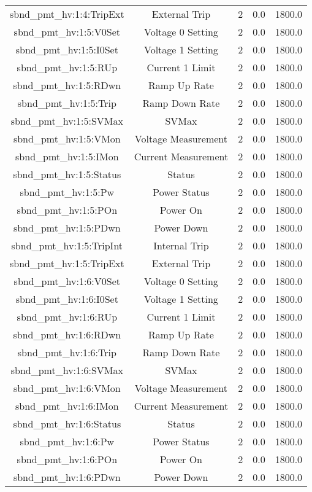 \begin{table}[ptb]
\begin{tabular}{c | c c c c}
sbnd_pmt_hv:1:4:TripExt & External Trip & 2 & 0.0 & 1800.0\\ 
sbnd_pmt_hv:1:5:V0Set & Voltage 0 Setting & 2 & 0.0 & 1800.0\\ 
sbnd_pmt_hv:1:5:I0Set & Voltage 1 Setting & 2 & 0.0 & 1800.0\\ 
sbnd_pmt_hv:1:5:RUp & Current 1 Limit & 2 & 0.0 & 1800.0\\ 
sbnd_pmt_hv:1:5:RDwn & Ramp Up Rate & 2 & 0.0 & 1800.0\\ 
sbnd_pmt_hv:1:5:Trip & Ramp Down Rate & 2 & 0.0 & 1800.0\\ 
sbnd_pmt_hv:1:5:SVMax & SVMax & 2 & 0.0 & 1800.0\\ 
sbnd_pmt_hv:1:5:VMon & Voltage Measurement & 2 & 0.0 & 1800.0\\ 
sbnd_pmt_hv:1:5:IMon & Current Measurement & 2 & 0.0 & 1800.0\\ 
sbnd_pmt_hv:1:5:Status & Status & 2 & 0.0 & 1800.0\\ 
sbnd_pmt_hv:1:5:Pw & Power Status & 2 & 0.0 & 1800.0\\ 
sbnd_pmt_hv:1:5:POn & Power On & 2 & 0.0 & 1800.0\\ 
sbnd_pmt_hv:1:5:PDwn & Power Down & 2 & 0.0 & 1800.0\\ 
sbnd_pmt_hv:1:5:TripInt & Internal Trip & 2 & 0.0 & 1800.0\\ 
sbnd_pmt_hv:1:5:TripExt & External Trip & 2 & 0.0 & 1800.0\\ 
sbnd_pmt_hv:1:6:V0Set & Voltage 0 Setting & 2 & 0.0 & 1800.0\\ 
sbnd_pmt_hv:1:6:I0Set & Voltage 1 Setting & 2 & 0.0 & 1800.0\\ 
sbnd_pmt_hv:1:6:RUp & Current 1 Limit & 2 & 0.0 & 1800.0\\ 
sbnd_pmt_hv:1:6:RDwn & Ramp Up Rate & 2 & 0.0 & 1800.0\\ 
sbnd_pmt_hv:1:6:Trip & Ramp Down Rate & 2 & 0.0 & 1800.0\\ 
sbnd_pmt_hv:1:6:SVMax & SVMax & 2 & 0.0 & 1800.0\\ 
sbnd_pmt_hv:1:6:VMon & Voltage Measurement & 2 & 0.0 & 1800.0\\ 
sbnd_pmt_hv:1:6:IMon & Current Measurement & 2 & 0.0 & 1800.0\\ 
sbnd_pmt_hv:1:6:Status & Status & 2 & 0.0 & 1800.0\\ 
sbnd_pmt_hv:1:6:Pw & Power Status & 2 & 0.0 & 1800.0\\ 
sbnd_pmt_hv:1:6:POn & Power On & 2 & 0.0 & 1800.0\\ 
sbnd_pmt_hv:1:6:PDwn & Power Down & 2 & 0.0 & 1800.0\\ 

\end{tabular}
\end{table}
